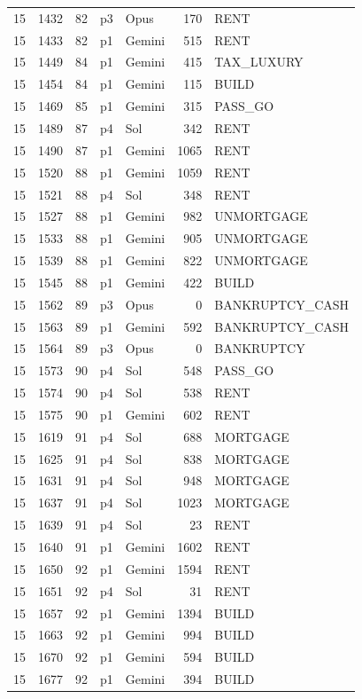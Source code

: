 \begin{longtable}{r r r l l r L{2.2in}}
15 & 1432 & 82 & p3 & Opus & 170 & RENT \\
15 & 1433 & 82 & p1 & Gemini & 515 & RENT \\
15 & 1449 & 84 & p1 & Gemini & 415 & TAX\_LUXURY \\
15 & 1454 & 84 & p1 & Gemini & 115 & BUILD \\
15 & 1469 & 85 & p1 & Gemini & 315 & PASS\_GO \\
15 & 1489 & 87 & p4 & Sol & 342 & RENT \\
15 & 1490 & 87 & p1 & Gemini & 1065 & RENT \\
15 & 1520 & 88 & p1 & Gemini & 1059 & RENT \\
15 & 1521 & 88 & p4 & Sol & 348 & RENT \\
15 & 1527 & 88 & p1 & Gemini & 982 & UNMORTGAGE \\
15 & 1533 & 88 & p1 & Gemini & 905 & UNMORTGAGE \\
15 & 1539 & 88 & p1 & Gemini & 822 & UNMORTGAGE \\
15 & 1545 & 88 & p1 & Gemini & 422 & BUILD \\
15 & 1562 & 89 & p3 & Opus & 0 & BANKRUPTCY\_CASH \\
15 & 1563 & 89 & p1 & Gemini & 592 & BANKRUPTCY\_CASH \\
15 & 1564 & 89 & p3 & Opus & 0 & BANKRUPTCY \\
15 & 1573 & 90 & p4 & Sol & 548 & PASS\_GO \\
15 & 1574 & 90 & p4 & Sol & 538 & RENT \\
15 & 1575 & 90 & p1 & Gemini & 602 & RENT \\
15 & 1619 & 91 & p4 & Sol & 688 & MORTGAGE \\
15 & 1625 & 91 & p4 & Sol & 838 & MORTGAGE \\
15 & 1631 & 91 & p4 & Sol & 948 & MORTGAGE \\
15 & 1637 & 91 & p4 & Sol & 1023 & MORTGAGE \\
15 & 1639 & 91 & p4 & Sol & 23 & RENT \\
15 & 1640 & 91 & p1 & Gemini & 1602 & RENT \\
15 & 1650 & 92 & p1 & Gemini & 1594 & RENT \\
15 & 1651 & 92 & p4 & Sol & 31 & RENT \\
15 & 1657 & 92 & p1 & Gemini & 1394 & BUILD \\
15 & 1663 & 92 & p1 & Gemini & 994 & BUILD \\
15 & 1670 & 92 & p1 & Gemini & 594 & BUILD \\
15 & 1677 & 92 & p1 & Gemini & 394 & BUILD \\

\end{longtable}
